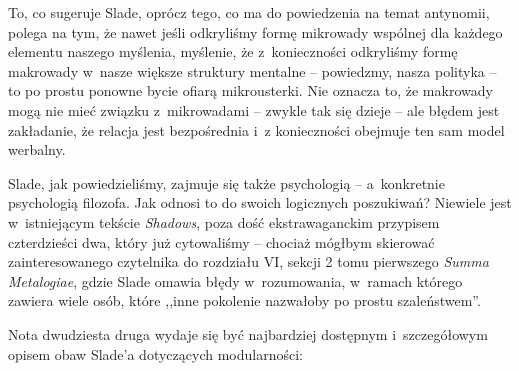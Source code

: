 \documentclass[oneside,polish,11pt,rmheadings]{mwbk}
\begin{document}
To, co sugeruje Slade, oprócz tego, co ma do powiedzenia na temat antynomii, polega na tym, że nawet jeśli odkryliśmy formę mikrowady wspólnej dla każdego elementu naszego myślenia, myślenie, że z~konieczności odkryliśmy formę makrowady w~nasze większe struktury mentalne -- powiedzmy, nasza polityka -- to po prostu ponowne bycie ofiarą mikrousterki. Nie oznacza to, że makrowady mogą nie mieć związku z~mikrowadami -- zwykle tak się dzieje -- ale błędem jest zakładanie, że relacja jest bezpośrednia i~z konieczności obejmuje ten sam model werbalny. 

Slade, jak powiedzieliśmy, zajmuje się także psychologią -- a~konkretnie psychologią filozofa. Jak odnosi to do swoich logicznych poszukiwań? Niewiele jest w~istniejącym tekście \textit{Shadows}, poza dość ekstrawaganckim przypisem czterdzieści dwa, który już cytowaliśmy -- chociaż mógłbym skierować zainteresowanego czytelnika do rozdziału VI, sekcji 2 tomu pierwszego \textit{Summa Metalogiae}, gdzie Slade omawia błędy w~rozumowania, w~ramach którego zawiera wiele osób, które ,,inne pokolenie nazwałoby po prostu szaleństwem''. 

Nota dwudziesta druga wydaje się być najbardziej dostępnym i~szczegółowym opisem obaw Slade'a dotyczących modularności: 

\smallskip
\end{document}
